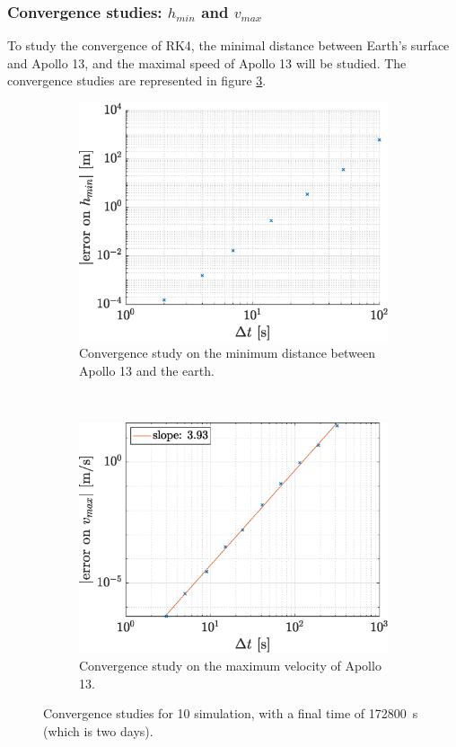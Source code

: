 \documentclass[a4paper,12pt,twoside]{article}
\begin{document}
\subsubsection{Convergence studies: $h_{min}$ and $v_{max}$}
To study the convergence of RK4, the minimal distance between Earth's surface and Apollo 13, and the maximal speed of Apollo 13 will be studied.
The convergence studies are represented in figure \ref{fig:1b_conv}.

\begin{figure}[h]
  \centering
  \begin{subfigure}[t]{0.45\textwidth}
    \includegraphics[width=\textwidth]{graphs/ex1b_conv_h.eps}
    \caption{Convergence study on the minimum distance between Apollo 13 and the earth.}
    \label{fig:1b_conv_hmin}
  \end{subfigure}
  ~
  \begin{subfigure}[t]{0.45\textwidth}
    \includegraphics[width=\textwidth]{graphs/ex1b_conv_vel.eps}
    \caption{Convergence study on the maximum velocity of Apollo 13.}
    \label{fig:1b_conv_vmax}
  \end{subfigure}
  \caption{Convergence studies for 10 simulation, with a final time of \SI{172800}{\s} (which is two days).}
  \label{fig:1b_conv}
\end{figure}
\end{document}
